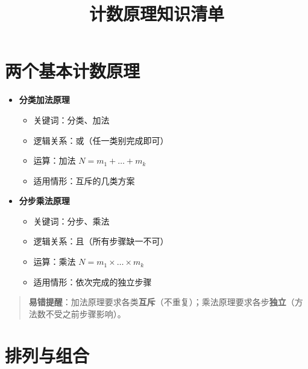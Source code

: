 \documentclass[10pt]{article}
\title{计数原理知识清单}
\author{}
\date{}
\begin{document}
\maketitle

\section{两个基本计数原理}

\begin{itemize}
\item \textbf{分类加法原理}
  \begin{itemize}
  \item 关键词：分类、加法
  \item 逻辑关系：或（任一类别完成即可）
  \item 运算：加法 \(N = m_1 + \dots + m_k\)
  \item 适用情形：互斥的几类方案
  \end{itemize}
\item \textbf{分步乘法原理}
  \begin{itemize}
  \item 关键词：分步、乘法
  \item 逻辑关系：且（所有步骤缺一不可）
  \item 运算：乘法 \(N = m_1 \times \dots \times m_k\)
  \item 适用情形：依次完成的独立步骤
  \end{itemize}
\end{itemize}

\begin{quote}
\textbf{易错提醒}：加法原理要求各类\textbf{互斥}（不重复）；乘法原理要求各步\textbf{独立}（方法数不受之前步骤影响）。
\end{quote}

\section{排列与组合}
\end{document}
